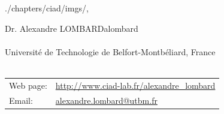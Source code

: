 \begin{graphicspathcontext}{{./chapters/ciad/imgs/},\old}
	
\begin{textpictureframe}{Dr\string. Alexandre LOMBARD}{alombard}
	\vspace{-.25cm}
	 \\
	 \\[.25cm]
	{\scriptsize Universit\'e de Technologie de Belfort-Montb\'eliard, France} \\[.25cm]
	
	 \\[.25cm]
	
	\scriptsize \begin{tabularx}{\linewidth}{@{}lX@{}}
		Web page: & \url{http://www.ciad-lab.fr/alexandre_lombard} \\
		Email: & \href{mailto:alexandre.lombard@utbm.fr}{alexandre.lombard@utbm.fr} \\
	\end{tabularx} \\[.5cm]
	
\end{textpictureframe}
	
\end{graphicspathcontext}

\endinput
